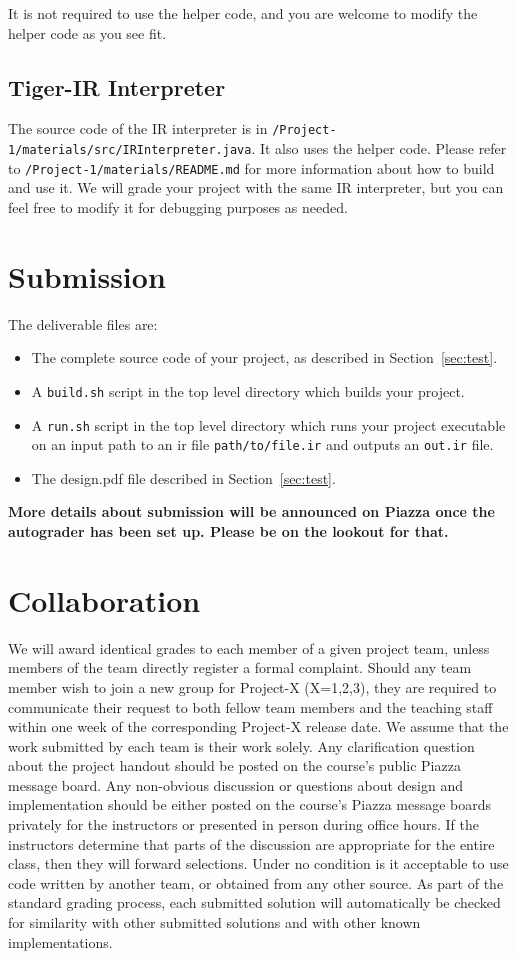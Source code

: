 \documentclass[12pt]{article}
\begin{document}
It is not required to use the helper code, and you are welcome to
modify the helper code as you see fit.

\subsection{Tiger-IR Interpreter}

The source code of the IR interpreter is in \texttt{/Project-1/materials/src/IRInterpreter.java}.
It also uses the helper code.
Please refer to \texttt{/Project-1/materials/README.md} for more information about how to build and use it.
We will grade your project with the same IR interpreter, but you can
feel free to modify it for debugging purposes as needed.

\section{Submission}

The deliverable files are:
\begin{itemize}
    \item The complete source code of your project, as described in Section~\ref{sec:test}.
    \item A \texttt{build.sh} script in the top level directory which builds your project.
    \item A \texttt{run.sh}  script in the top level directory which runs your project executable on an input path to an ir file \texttt{path/to/file.ir}  and outputs an \texttt{out.ir}  file.
    \item The design.pdf file described in Section~\ref{sec:test}.
\end{itemize}

\textbf{More details about submission will be announced on Piazza once the autograder has been set up. Please be on the lookout for that.}

\section{Collaboration}
%
We will award identical grades to each member of a given project team, unless members of the team directly register a formal complaint. Should any team member wish to join a new group for Project-X (X=1,2,3), they are required to communicate their request to both fellow team members and the teaching staff within one week of the corresponding Project-X release date.
%
We assume that the work submitted by each team is their work solely.
% 
Any clarification question about the project handout should be posted
on the course's public Piazza message
board.
%
Any non-obvious discussion or questions about design and
implementation should be either posted on the course's Piazza message
boards privately for the instructors or presented in person during
office hours.
%
If the instructors determine that parts of the discussion are
appropriate for the entire class, then they will forward selections.
%
Under no condition is it acceptable to use code written by another
team, or obtained from any other source.
%
As part of the standard grading process, each submitted solution will
automatically be checked for similarity with other submitted solutions and with other known
implementations.
\end{document}
